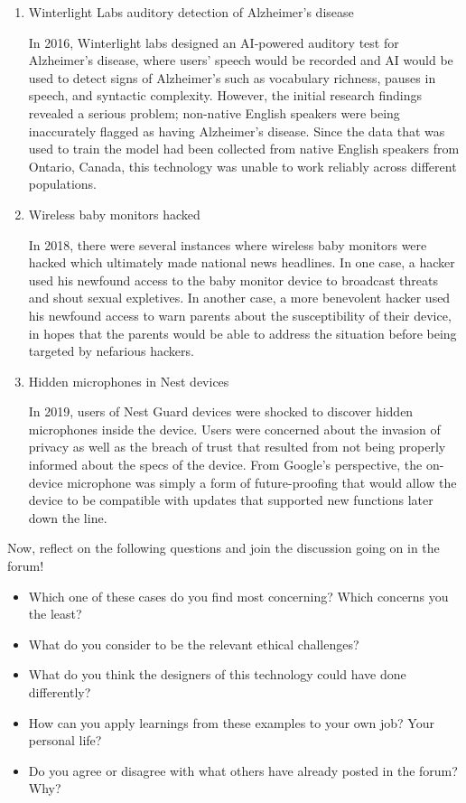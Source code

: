   \begin{enumerate}
    \item  Winterlight Labs auditory detection of Alzheimer’s disease

In 2016, Winterlight labs designed an AI-powered auditory test for Alzheimer’s disease, where users’ speech would be recorded and AI would be used to detect signs of Alzheimer’s such as vocabulary richness, pauses in speech, and syntactic complexity. However, the initial research findings revealed a serious problem; non-native English speakers were being inaccurately flagged as having Alzheimer’s disease. Since the data that was used to train the model had been collected from native English speakers from Ontario, Canada, this technology was unable to work reliably across different populations. 

\item  Wireless baby monitors hacked

In 2018, there were several instances where wireless baby monitors were hacked which ultimately made national news headlines. In one case, a hacker used his newfound access to the baby monitor device to broadcast threats and shout sexual expletives. In another case, a more benevolent hacker used his newfound access to warn parents about the susceptibility of their device, in hopes that the parents would be able to address the situation before being targeted by nefarious hackers. 

\item  Hidden microphones in Nest devices

In 2019, users of Nest Guard devices were shocked to discover hidden microphones inside the device. Users were concerned about the invasion of privacy as well as the breach of trust that resulted from not being properly informed about the specs of the device. From Google’s perspective, the on-device microphone was simply a form of future-proofing that would allow the device to be compatible with updates that supported new functions later down the line.

\end{enumerate}

Now, reflect on the following questions and join the discussion going on in the forum!

\begin{itemize}
  \item [A.] Which one of these cases do you find most concerning? Which concerns you the least?
  \item [B.] What do you consider to be the relevant ethical challenges? 
  \item [C.] What do you think the designers of this technology could have done differently?
  \item [D.] How can you apply learnings from these examples to your own job? Your personal life?
  \item [E.] Do you agree or disagree with what others have already posted in the forum? Why?
\end{itemize}


